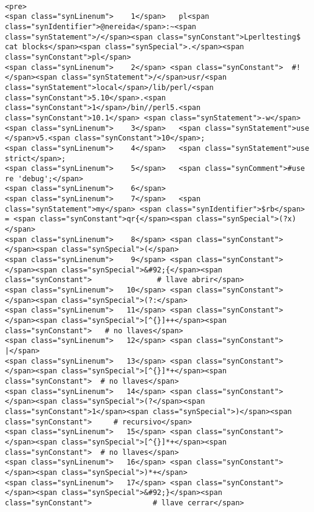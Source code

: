 \begin{verbatim}

<pre>
<span class="synLinenum">    1</span>   pl<span class="synIdentifier">@nereida</span>:~<span class="synStatement">/</span><span class="synConstant">Lperltesting$ cat blocks</span><span class="synSpecial">.</span><span class="synConstant">pl</span>
<span class="synLinenum">    2</span> <span class="synConstant">  #!</span><span class="synStatement">/</span>usr/<span class="synStatement">local</span>/lib/perl/<span class="synConstant">5.10</span>.<span class="synConstant">1</span>/bin//perl5.<span class="synConstant">10.1</span> <span class="synStatement">-w</span>
<span class="synLinenum">    3</span>   <span class="synStatement">use </span>v5.<span class="synConstant">10</span>;
<span class="synLinenum">    4</span>   <span class="synStatement">use strict</span>;
<span class="synLinenum">    5</span>   <span class="synComment">#use re 'debug';</span>
<span class="synLinenum">    6</span>   
<span class="synLinenum">    7</span>   <span class="synStatement">my</span> <span class="synIdentifier">$rb</span> = <span class="synConstant">qr{</span><span class="synSpecial">(?x)</span>
<span class="synLinenum">    8</span> <span class="synConstant">      </span><span class="synSpecial">(</span>
<span class="synLinenum">    9</span> <span class="synConstant">        </span><span class="synSpecial">&#92;{</span><span class="synConstant">               # llave abrir</span>
<span class="synLinenum">   10</span> <span class="synConstant">           </span><span class="synSpecial">(?:</span>
<span class="synLinenum">   11</span> <span class="synConstant">               </span><span class="synSpecial">[^{}]++</span><span class="synConstant">   # no llaves</span>
<span class="synLinenum">   12</span> <span class="synConstant">           |</span>
<span class="synLinenum">   13</span> <span class="synConstant">                </span><span class="synSpecial">[^{}]*+</span><span class="synConstant">  # no llaves</span>
<span class="synLinenum">   14</span> <span class="synConstant">                </span><span class="synSpecial">(?</span><span class="synConstant">1</span><span class="synSpecial">)</span><span class="synConstant">     # recursivo</span>
<span class="synLinenum">   15</span> <span class="synConstant">                </span><span class="synSpecial">[^{}]*+</span><span class="synConstant">  # no llaves</span>
<span class="synLinenum">   16</span> <span class="synConstant">           </span><span class="synSpecial">)*+</span>
<span class="synLinenum">   17</span> <span class="synConstant">         </span><span class="synSpecial">&#92;}</span><span class="synConstant">              # llave cerrar</span>

\end{verbatim}
